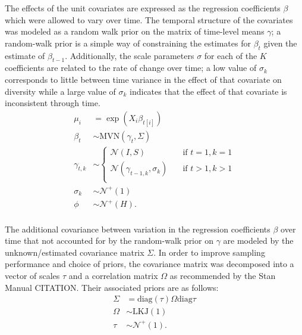 \documentclass[12pt,letterpaper]{article}
\begin{document}
The effects of the unit covariates are expressed as the regression coefficients \(\beta\) which were allowed to vary over time. The temporal structure of the covariates was modeled as a random walk prior on the matrix of time-level means \(\gamma\); a random-walk prior is a simple way of constraining the estimates for \(\beta_{t}\) given the estimate of \(\beta_{t - 1}\). Additionally, the scale parameters \(\sigma\) for each of the \(K\) coefficients are related to the rate of change over time; a low value of \(\sigma_{k}\) corresponds to little between time variance in the effect of that covariate on diversity while a large value of \(\sigma_{k}\) indicates that the effect of that covariate is inconsistent through time.
\begin{equation}
  \begin{aligned}
    \mu_{i} &= \exp(X_{i} \beta_{t[i]}) \\
    \beta_{t} &\sim \text{MVN}(\gamma_{t}, \Sigma) \\
    \gamma_{t, k} &\sim 
      \begin{cases}
        \mathcal{N}(I, S) & \quad \text{if } t = 1, k = 1 \\
        \mathcal{N}(\gamma_{t - 1, k}, \sigma_{k}) & \quad \text{if } t > 1, k > 1 \\
      \end{cases} \\
    \sigma_{k} &\sim \mathcal{N}^{+}(1) \\ 
    \phi &\sim \mathcal{N}^{+}(H). \\
  \end{aligned}
\end{equation}

The additional covariance between variation in the regression coefficients \(\beta\) over time that not accounted for by the random-walk prior on \(\gamma\) are modeled by the unknown/estimated covariance matrix \(\Sigma\). In order to improve sampling performance and choice of priors, the covariance matrix was decomposed into a vector of scales \(\tau\) and a correlation matrix \(\Omega\) as recommended by the Stan Manual CITATION. Their associated priors are as follows:
\begin{equation}
  \begin{aligned}
    \Sigma &= \text{diag}(\tau) \Omega \text{diag}{\tau} \\
    \Omega &\sim \text{LKJ}(1) \\
    \tau &\sim \mathcal{N}^{+}(1). \\
  \end{aligned}
\end{equation}
\end{document}
